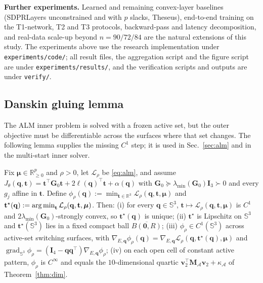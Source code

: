 \textbf{Further experiments.} Learned and remaining convex-layer baselines (SDPRLayers unconstrained and with $p$ slacks, Theseus), end-to-end training on the T1-network, T2 and T3 protocols, backward-pass and latency decomposition, and real-data scale-up beyond $n=90/72/84$ are the natural extensions of this study. The experiments above use the research implementation under \texttt{experiments/code/}; all result files, the aggregation script and the figure script are under \texttt{experiments/results/}, and the verification scripts and outputs are under \texttt{verify/}.

\subsection{Danskin gluing lemma}\label{app:danskin}
The ALM inner problem is solved with a frozen active set, but the outer objective must be differentiable across the surfaces where that set changes. The following lemma supplies the missing $C^1$ step; it is used in Sec.~\ref{sec:alm} and in the multi-start inner solver.
\begin{lemma}\label{lem:danskin}
Fix $\boldsymbol\mu\in\mathbb{R}^p_{\ge0}$ and $\rho>0$, let $\mathcal L_\rho$ be \eqref{eq:alm}, and assume $J_\theta(\mathbf q,\mathbf t)=\mathbf t^\top\mathbf G_0\mathbf t+2\boldsymbol\ell(\mathbf q)^\top\mathbf t+\alpha(\mathbf q)$ with $\mathbf G_0\succeq\lambda_{\min}(\mathbf G_0)\mathbf I_3\succ0$ and every $g_j$ affine in $\mathbf t$. Define $\phi_\rho(\mathbf q):=\min_{\mathbf t\in\mathbb{R}^3}\mathcal L_\rho(\mathbf q,\mathbf t,\boldsymbol\mu)$ and $\mathbf t^\star(\mathbf q):=\operatorname*{arg\,min}_{\mathbf t}\mathcal L_\rho(\mathbf q,\mathbf t,\boldsymbol\mu)$. Then:
(i) for every $\mathbf q\in\mathbb S^3$, $\mathbf t\mapsto\mathcal L_\rho(\mathbf q,\mathbf t,\boldsymbol\mu)$ is $C^1$ and $2\lambda_{\min}(\mathbf G_0)$-strongly convex, so $\mathbf t^\star(\mathbf q)$ is unique;
(ii) $\mathbf t^\star$ is Lipschitz on $\mathbb S^3$ and $\mathbf t^\star(\mathbb S^3)$ lies in a fixed compact ball $\overline{B(\mathbf 0,R)}$;
(iii) $\phi_\rho\in C^1(\mathbb S^3)$ across active-set switching surfaces, with $\nabla_{E,\mathbf q}\phi_\rho(\mathbf q)=\nabla_{E,\mathbf q}\mathcal L_\rho(\mathbf q,\mathbf t^\star(\mathbf q),\boldsymbol\mu)$ and $\operatorname{grad}_{\mathbb S^3}\phi_\rho=(\mathbf I_4-\mathbf q\mathbf q^\top)\nabla_{E,\mathbf q}\phi_\rho$;
(iv) on each open cell of constant active pattern, $\phi_\rho$ is $C^\infty$ and equals the $10$-dimensional quartic $\mathbf v_2^\top\mathbf M_{\mathcal A}\mathbf v_2+\kappa_{\mathcal A}$ of Theorem~\ref{thm:dim}.
\end{lemma}
